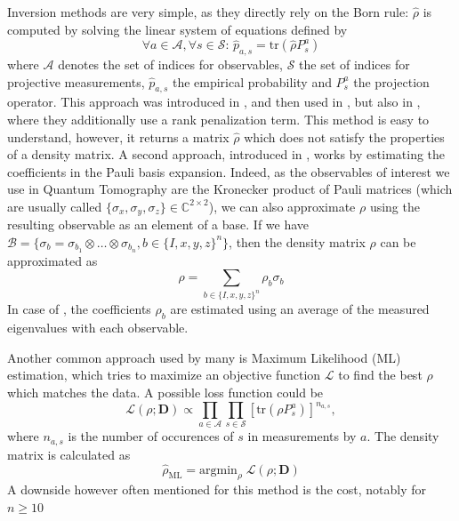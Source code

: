 \documentclass[12pt]{memoir}
\newcommand{\tr}{\text{tr}}
\newcommand{\mb}{\mathbf}
\begin{document}
Inversion methods are very simple, as they directly rely on the Born rule: $\hat \rho$ is computed by solving the linear system of equations defined by 
\begin{equation*} \label{eq:inversion-method}
        \forall a \in \mathcal{A},\forall s \in \mathcal{S}: \, \hat p_{a,s} = \tr(\hat \rho P^a_s)
\end{equation*}
where $\mathcal{A}$ denotes the set of indices for observables, $\mathcal{S}$ the set of indices for projective measurements, $\hat p_{a,s}$ the empirical probability and $P^a_s$ the projection operator. This approach was introduced in \cite{meth:linear-inversion:vogel-risken}, and then used in \cite{meth:linear-inversion:RMH}, but also in \cite{meth:linear-inversion:alquier}, where they additionally use a rank penalization term. This method is easy to understand, however, it returns a matrix $\hat \rho$ which does not satisfy the properties of a density matrix.\medbreak
A second approach, introduced in \cite{Cai-2016}, works by estimating the coefficients in the Pauli basis expansion. Indeed, as the observables of interest we use in Quantum Tomography are the Kronecker product of Pauli matrices (which are usually called $\{\sigma_x, \sigma_y, \sigma_z\} \in \mathbb{C}^{2\times 2}$), we can also approximate $\rho$ using the resulting observable as an element of a base. If we have $\mathcal{B} = \{\sigma_b = \sigma_{b_1} \otimes \dots \otimes \sigma_{b_n}, b \in \{I,x,y,z\}^n\}$, then the density matrix $\rho$ can be approximated as 
\begin{equation}
    \rho = \sum_{b\in\{I,x,y,z\}^n} \rho_b \sigma_b
\end{equation}
In case of \cite{Cai-2016}, the coefficients $\rho_b$ are estimated using an average of the measured eigenvalues with each observable.\medbreak

Another common approach used by many \cite{Guta20,meth:ML:BDP,meth:ML:JKMW,meth:ML:Lvovsky,meth:ML:Blume-Kohout,meth:ML:Suzuki,meth:ML:Hradil2004} is Maximum Likelihood (ML) estimation, which tries to maximize an objective function $\mathcal{L}$ to find the best $\rho$ which matches the data. A possible loss function could be 
\begin{equation}
\mathcal{L}(\rho ; \mb{D}) \propto \prod_{a \in \mathcal{A}} \prod_{s \in \mathcal{S}}\left[\tr\left(\rho P_{{s}}^{{a}}\right)\right]^{n_{{a}, {s}}},
\end{equation}
where $n_{a,s}$ is the number of occurences of $s$ in measurements by $a$. The density matrix is calculated as 
\begin{equation}
    \hat \rho_{\text{ML}} = \text{argmin}_{\rho} \;\mathcal{L}(\rho;\mb{D})
\end{equation}
A downside however often mentioned for this method is the cost, notably for $n\geq10$
\medbreak
\end{document}
